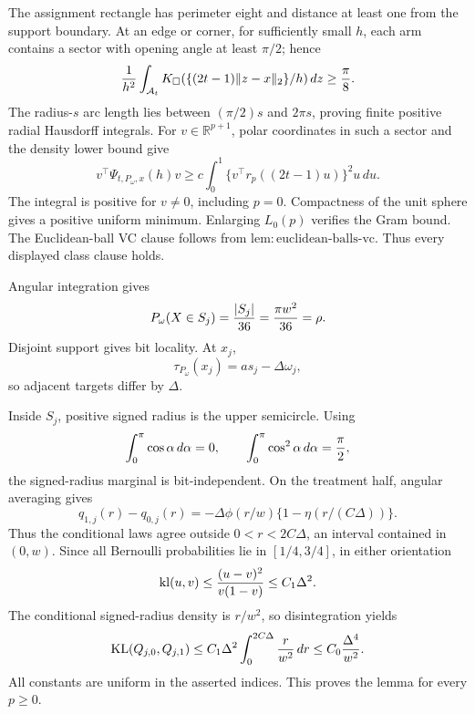 The assignment rectangle has perimeter eight and distance at least one from the support boundary.  At an edge or corner, for sufficiently small \(h\), each arm contains a sector with opening angle at least \(\pi/2\); hence
\[
 {1\over h^2}\int_{\mathcal A_t}K_\square(\{(2t-1)\|z-x\|_2\}/h)\,dz\geq{\pi\over8}.
\]
The radius-\(s\) arc length lies between \((\pi/2)s\) and \(2\pi s\), proving finite positive radial Hausdorff integrals.  For \(v\in\mathbb R^{p+1}\), polar coordinates in such a sector and the density lower bound give
\[
 v^\top\Psi_{t,P_\omega,x}(h)v
 \geq c\int_0^1\{v^\top r_p((2t-1)u)\}^2u\,du.
\]
The integral is positive for \(v\ne0\), including \(p=0\).  Compactness of the unit sphere gives a positive uniform minimum.  Enlarging \(L_0(p)\) verifies the Gram bound.  The Euclidean-ball VC clause follows from \(\mathrm{lem:euclidean\text{-}balls\text{-}vc}\).  Thus every displayed class clause holds.

Angular integration gives
\[
 P_\omega(X\in S_j)={|S_j|\over36}={\pi w^2\over36}=\rho.
\]
Disjoint support gives bit locality.  At \(x_j\),
\[
 \tau_{P_\omega}(x_j)=as_j-\Delta\omega_j,
\]
so adjacent targets differ by \(\Delta\).

Inside \(S_j\), positive signed radius is the upper semicircle.  Using
\[
 \int_0^\pi\cos\alpha\,d\alpha=0,
 \qquad \int_0^\pi\cos^2\alpha\,d\alpha={\pi\over2},
\]
the signed-radius marginal is bit-independent.  On the treatment half, angular averaging gives
\[
 q_{1,j}(r)-q_{0,j}(r)
 =-\Delta\phi(r/w)\{1-\eta(r/(C\Delta))\}.
\]
Thus the conditional laws agree outside \(0<r<2C\Delta\), an interval contained in \((0,w)\).  Since all Bernoulli probabilities lie in \([1/4,3/4]\), in either orientation
\[
 \operatorname{kl}(u,v)\leq{(u-v)^2\over v(1-v)}\leq C_1\Delta^2.
\]
The conditional signed-radius density is \(r/w^2\), so disintegration yields
\[
 \operatorname{KL}(Q_{j,0},Q_{j,1})
 \leq C_1\Delta^2\int_0^{2C\Delta}{r\over w^2}\,dr
 \leq C_0{\Delta^4\over w^2}.
\]
All constants are uniform in the asserted indices.  This proves the lemma for every \(p\geq0\).